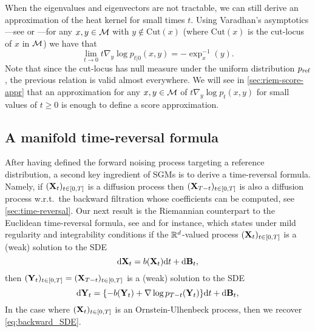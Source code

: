 When the eigenvalues and eigenvectors are not tractable, we
can still derive an approximation of the heat kernel for small times $t$. Using
Varadhan's asymptotics---see \citet[Theorem 3.8]{bismut1984large} or
\citet[Theorem 2.1]{chen2021logarithmic}---for any $x, y \in \mathcal M$ with
$y \notin \mathrm{Cut}(x)$ (where $\mathrm{Cut}(x)$ is the cut-locus of $x$
in $\mathcal M$) we have that \cite[see][Chapter 10]{lee2018introduction} 
\begin{equation}
  \label{eq:varadhan}
  \textstyle{\lim_{t \to 0} t \nabla_y \log p_{t|0}(x,y) = - \exp^{-1}_x(y) . }
\end{equation}
Note that since the cut-locus has null measure under the uniform distribution
$p_{\textup{ref}}$ \citep[Theorem 10.34]{lee2006riemannian}, the previous relation is
valid almost everywhere.  We will see in \cref{sec:riem-score-appr} that an
approximation for any $x, y \in \mathcal M$ of $t \nabla_y \log p_t(x,y)$ for small
values of $t \geq 0$ is enough to define a score approximation.


\subsection{A manifold time-reversal formula}
\label{sec:time-revers-form}

After having defined the forward noising process targeting a reference
distribution, a second key ingredient of SGMs is to derive a time-reversal
formula. Namely, if $(\mathbf{X}_t)_{t \in \left[0,T\right]}$ is a diffusion process then
$(\mathbf{X}_{T-t})_{t \in \left[0,T\right]}$ is also a diffusion process w.r.t.\ the
backward filtration whose coefficients can be computed, see
\cref{sec:time-reversal}.  Our next result is the Riemannian
counterpart to the Euclidean time-reversal formula, see \citet[Theorem
4.9]{cattiaux2021time} and \citet{haussmann1986time} for instance, which states
under mild regularity and integrability conditions if the $\mathbb{R}^d$-valued
process $(\mathbf{X}_t)_{t \in \left[0,T\right]}$ is a (weak) solution to the SDE
\begin{equation}
  \mathrm{d} \mathbf{X}_t = b(\mathbf{X}_t) \mathrm{d} t +  \mathrm{d}  \mathbf{B}_t  , 
\end{equation}
then $(\mathbf{Y}_t)_{t \in \left[0,T\right]} = (\mathbf{X}_{T-t})_{t \in \left[0,T\right]}$ is a
(weak) solution to the SDE
\begin{equation}
  \mathrm{d} \mathbf{Y}_t = \{-b(\mathbf{Y}_t) + \nabla \log p_{T-t}(\mathbf{Y}_t) \}\mathrm{d} t + \mathrm{d} \mathbf{B}_t  , 
\end{equation}
In the case where $(\mathbf{X}_t)_{t \in \left[0,T\right]}$ is an Ornstein-Ulhenbeck
process, then we recover \cref{eq:backward_SDE}. 

